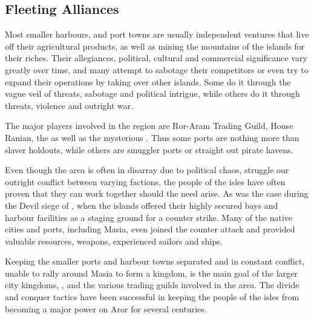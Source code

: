 \subsection{Fleeting Alliances}

Most smaller harbours, and port towns are usually independent ventures that
live off their agricultural products, as well as mining the mountains of
the islands for their riches. Their allegiances, political, cultural and
commercial significance vary greatly over time, and many attempt to sabotage
their competitors or even try to expand their operations by taking over other
islands. Some do it through the vague veil of threats, sabotage and political
intrigue, while others do it through threats, violence and outright war.

The major players involved in the region are Ror-Aram Trading Guild, House
Ranian, the  as well as the mysterious
. Thus some ports are nothing more than slaver
holdouts, while others are smuggler ports or straight out pirate havens.

Even though the area is often in disarray due to political chaos, struggle our
outright conflict between varying factions, the people of the isles have often
proven that they can work together should the need arise. As was the case during
the Devil siege of , when the islands offered their highly
secured bays and harbour facilities as a staging ground for a counter strike.
Many of the native cities and ports, including Masia, even joined the counter
attack and provided valuable resources, weapons, experienced sailors and ships.

Keeping the smaller ports and harbour towns separated and in constant
conflict, unable to rally around Masia to form a kingdom, is the main goal of
the larger city kingdoms, , and the various trading
guilds involved in the area. The divide and conquer tactics have been
successful in keeping the people of the isles from becoming a major power on
Aror for several centuries.
